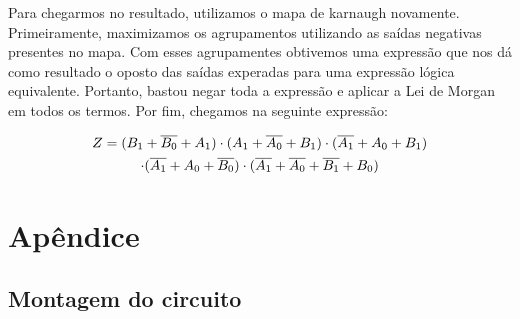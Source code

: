\documentclass[a4,12pt]{horizon-theme}
\begin{document}
Para chegarmos no resultado, utilizamos o mapa de karnaugh novamente. Primeiramente, maximizamos os agrupamentos utilizando as saídas negativas presentes no mapa. Com esses agrupamentes obtivemos uma expressão que nos dá como resultado o oposto das saídas experadas para uma expressão lógica equivalente. Portanto, bastou negar toda a expressão e aplicar a Lei de Morgan em todos os termos. Por fim, chegamos na seguinte expressão:

\begin{multline}
  Z = (B_1 + \overline{B_0} + A_1) \cdot (A_1 + \overline{A_0} + B_1) \cdot (\overline{A_1} + A_0 + B_1) \\
  \cdot (\overline{A_1} + A_0 + \overline{B_0}) \cdot (\overline{A_1} + \overline{A_0} + \overline{B_1} + B_0)
\end{multline}


\clearpage
\newpage
\appendix
\section*{Apêndice}
\renewcommand{\thesubsection}{\Alph{subsection}}
\subsection{Montagem do circuito}
\end{document}
